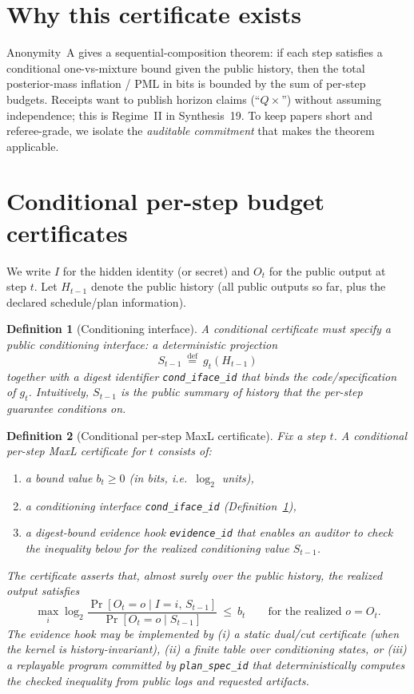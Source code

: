 \documentclass[11pt]{article}
\newtheorem{definition}{Definition}
\newcommand{\defeq}{\stackrel{\mathrm{def}}{=}}
\begin{document}
\section{Why this certificate exists}
Anonymity~A gives a sequential-composition theorem: if each step satisfies a conditional one-vs-mixture bound given the public history,
then the total posterior-mass inflation / PML in bits is bounded by the sum of per-step budgets.\cite{series:oddsinflation}
Receipts want to publish horizon claims (``$Q\times$'') without assuming independence; this is Regime~II in Synthesis~19.\cite{series:accountingrulebook}
To keep papers short and referee-grade, we isolate the \emph{auditable commitment} that makes the theorem applicable.

\section{Conditional per-step budget certificates}
We write $I$ for the hidden identity (or secret) and $O_t$ for the public output at step $t$.
Let $H_{t-1}$ denote the public history (all public outputs so far, plus the declared schedule/plan information).

\begin{definition}[Conditioning interface]\label{def:conditioning}
A conditional certificate must specify a public \emph{conditioning interface}:
a deterministic projection
\[
S_{t-1}\ \defeq\ g_t(H_{t-1})
\]
together with a digest identifier \texttt{cond\_iface\_id} that binds the code/specification of $g_t$.
Intuitively, $S_{t-1}$ is the public summary of history that the per-step guarantee conditions on.
\end{definition}

\begin{definition}[Conditional per-step MaxL certificate]\label{def:cps}
Fix a step $t$.
A \emph{conditional per-step MaxL certificate} for $t$ consists of:
\begin{enumerate}[leftmargin=*]
\item a bound value $b_t\ge 0$ (in \emph{bits}, i.e.\ $\log_2$ units),
\item a conditioning interface \texttt{cond\_iface\_id} (Definition~\ref{def:conditioning}),
\item a digest-bound \emph{evidence hook} \texttt{evidence\_id} that enables an auditor to check the inequality below for the realized conditioning value $S_{t-1}$.
\end{enumerate}
The certificate asserts that, almost surely over the public history, the realized output satisfies
\begin{equation}\label{eq:condmaxl}
\max_i \log_2 \frac{\Pr[O_t=o\mid I=i,\,S_{t-1}]}{\Pr[O_t=o\mid S_{t-1}]}\ \le\ b_t
\qquad\text{for the realized }o=O_t.
\end{equation}
The evidence hook may be implemented by (i) a static dual/cut certificate (when the kernel is history-invariant),
(ii) a finite table over conditioning states, or (iii) a replayable program committed by \texttt{plan\_spec\_id} that deterministically computes the checked inequality from public logs and requested artifacts.
\end{definition}
\end{document}
